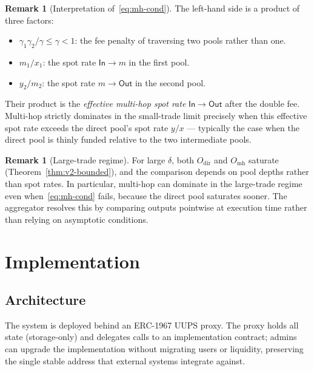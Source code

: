 \documentclass[11pt,a4paper]{article}
\theoremstyle{definition}
\newtheorem{remark}[theorem]{Remark}
\begin{document}
\begin{remark}[Interpretation of~\eqref{eq:mh-cond}]
The left-hand side is a product of three factors:
\begin{itemize}
    \item $\gamma_1 \gamma_2 / \gamma \leq \gamma < 1$: the fee penalty of
          traversing two pools rather than one.
    \item $m_1 / x_1$: the spot rate $\mathsf{In} \to m$ in the first pool.
    \item $y_2 / m_2$: the spot rate $m \to \mathsf{Out}$ in the second pool.
\end{itemize}
Their product is the \emph{effective multi-hop spot rate} $\mathsf{In} \to
\mathsf{Out}$ after the double fee. Multi-hop strictly dominates in the
small-trade limit precisely when this effective spot rate exceeds the direct
pool's spot rate $y/x$ --- typically the case when the direct pool is thinly
funded relative to the two intermediate pools.
\end{remark}

\begin{remark}[Large-trade regime]
For large $\delta$, both $O_{\mathrm{dir}}$ and $O_{\mathrm{mh}}$ saturate
(Theorem~\ref{thm:v2-bounded}), and the comparison depends on pool depths rather
than spot rates. In particular, multi-hop can dominate in the large-trade regime
even when~\eqref{eq:mh-cond} fails, because the direct pool saturates sooner.
The aggregator resolves this by comparing outputs pointwise at execution time
rather than relying on asymptotic conditions.
\end{remark}

\section{Implementation}
\label{sec:impl}

\subsection{Architecture}

The system is deployed behind an ERC-1967 UUPS proxy. The proxy holds all state
(storage-only) and delegates calls to an implementation contract; admins can
upgrade the implementation without migrating users or liquidity, preserving the
single stable address that external systems integrate against.
\end{document}
